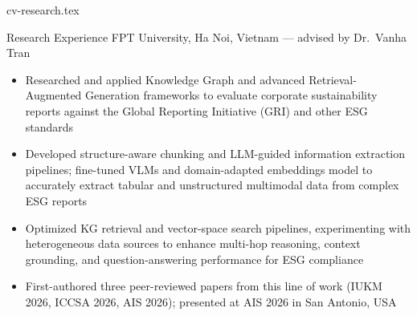 %
%
%
%

\begin{filecontents*}[overwrite]{cv-research.tex}
\begin{rubric}{Research Experience}
 \newline
FPT University, Ha Noi, Vietnam --- advised by Dr.\ Vanha Tran
\begin{itemize}
  \item Researched and applied Knowledge Graph and advanced Retrieval-Augmented Generation frameworks to evaluate corporate sustainability reports against the Global Reporting Initiative (GRI) and other ESG standards
  \item Developed structure-aware chunking and LLM-guided information extraction pipelines; fine-tuned VLMs and domain-adapted embeddings model to accurately extract tabular and unstructured multimodal data from complex ESG reports
  \item Optimized KG retrieval and vector-space search pipelines, experimenting with heterogeneous data sources to enhance multi-hop reasoning, context grounding, and question-answering performance for ESG compliance
  \item First-authored three peer-reviewed papers from this line of work (IUKM 2026, ICCSA 2026, AIS 2026); presented at AIS 2026 in San Antonio, USA
\end{itemize}
\end{rubric}
\end{filecontents*}


